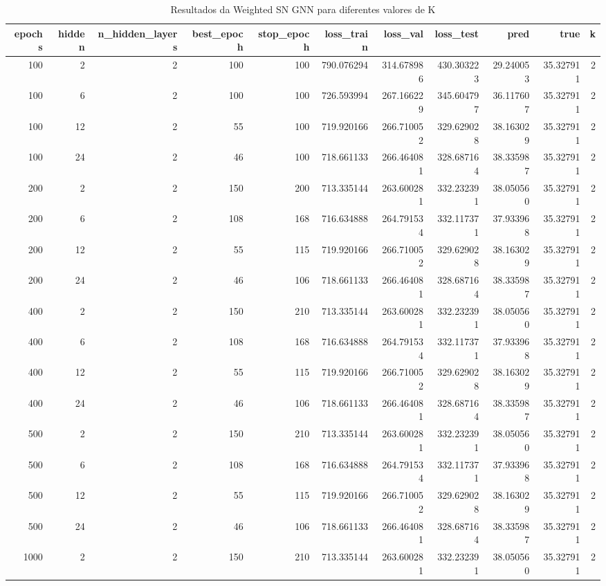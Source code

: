 \begin{table}
\caption{Resultados da Weighted SN GNN para diferentes valores de K}
\label{tab:weighted_gnn_results_all_k}
\begin{tabular}{rrrrrrrrrrr}
\toprule
epochs & hidden & n\_hidden\_layers & best\_epoch & stop\_epoch & loss\_train & loss\_val & loss\_test & pred & true & k \\
\midrule
100 & 2 & 2 & 100 & 100 & 790.076294 & 314.678986 & 430.303223 & 29.240053 & 35.327911 & 2 \\
100 & 6 & 2 & 100 & 100 & 726.593994 & 267.166229 & 345.604797 & 36.117607 & 35.327911 & 2 \\
100 & 12 & 2 & 55 & 100 & 719.920166 & 266.710052 & 329.629028 & 38.163029 & 35.327911 & 2 \\
100 & 24 & 2 & 46 & 100 & 718.661133 & 266.464081 & 328.687164 & 38.335987 & 35.327911 & 2 \\
200 & 2 & 2 & 150 & 200 & 713.335144 & 263.600281 & 332.232391 & 38.050560 & 35.327911 & 2 \\
200 & 6 & 2 & 108 & 168 & 716.634888 & 264.791534 & 332.117371 & 37.933968 & 35.327911 & 2 \\
200 & 12 & 2 & 55 & 115 & 719.920166 & 266.710052 & 329.629028 & 38.163029 & 35.327911 & 2 \\
200 & 24 & 2 & 46 & 106 & 718.661133 & 266.464081 & 328.687164 & 38.335987 & 35.327911 & 2 \\
400 & 2 & 2 & 150 & 210 & 713.335144 & 263.600281 & 332.232391 & 38.050560 & 35.327911 & 2 \\
400 & 6 & 2 & 108 & 168 & 716.634888 & 264.791534 & 332.117371 & 37.933968 & 35.327911 & 2 \\
400 & 12 & 2 & 55 & 115 & 719.920166 & 266.710052 & 329.629028 & 38.163029 & 35.327911 & 2 \\
400 & 24 & 2 & 46 & 106 & 718.661133 & 266.464081 & 328.687164 & 38.335987 & 35.327911 & 2 \\
500 & 2 & 2 & 150 & 210 & 713.335144 & 263.600281 & 332.232391 & 38.050560 & 35.327911 & 2 \\
500 & 6 & 2 & 108 & 168 & 716.634888 & 264.791534 & 332.117371 & 37.933968 & 35.327911 & 2 \\
500 & 12 & 2 & 55 & 115 & 719.920166 & 266.710052 & 329.629028 & 38.163029 & 35.327911 & 2 \\
500 & 24 & 2 & 46 & 106 & 718.661133 & 266.464081 & 328.687164 & 38.335987 & 35.327911 & 2 \\
1000 & 2 & 2 & 150 & 210 & 713.335144 & 263.600281 & 332.232391 & 38.050560 & 35.327911 & 2 \\

\end{tabular}
\end{table}
